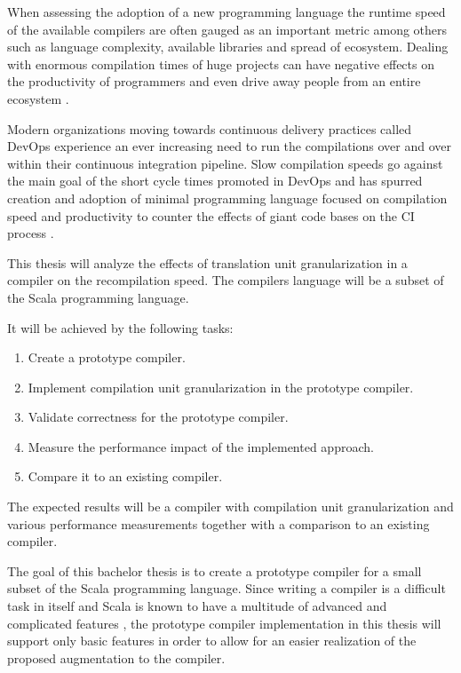 \documentclass{VUMIFPSbakalaurinis}
\begin{document}
When assessing the adoption of a new programming language the runtime speed of the available compilers are often gauged as an important metric \cite{ScalaSlow} among others such as language complexity, available libraries and spread of ecosystem.
Dealing with enormous compilation times of huge projects can have negative effects on the productivity of programmers and even drive away people from an entire ecosystem \cite{ScalaReallySlow, ScalaSlow}.

Modern organizations moving towards continuous delivery practices called DevOps \cite{DevOps} experience an ever increasing need to run the compilations over and over within their continuous integration pipeline.
Slow compilation speeds go against the main goal of the short cycle times promoted in DevOps and has spurred creation and adoption of minimal programming language focused on compilation speed and productivity to counter the effects of giant code bases on the CI process \cite{TheGoProgrammingLanguage, GoGoogle}.

This thesis will analyze the effects of translation unit granularization in a compiler on the recompilation speed.
The compilers language will be a subset of the Scala programming language.

It will be achieved by the following tasks:

\begin{enumerate}
\item{Create a prototype compiler.}
\item{Implement compilation unit granularization in the prototype compiler.}
\item{Validate correctness for the prototype compiler.}
\item{Measure the performance impact of the implemented approach.}
\item{Compare it to an existing compiler.}
\end{enumerate}

The expected results will be a compiler with compilation unit granularization and various performance measurements together with a comparison to an existing compiler.

The goal of this bachelor thesis is to create a prototype compiler for a small subset of the Scala programming language.
Since writing a compiler is a difficult task in itself and Scala is known to have a multitude of advanced and complicated features \cite{ScalaSpec}, the prototype compiler implementation in this thesis will support only basic features in order to allow for an easier realization of the proposed augmentation to the compiler.
\end{document}
